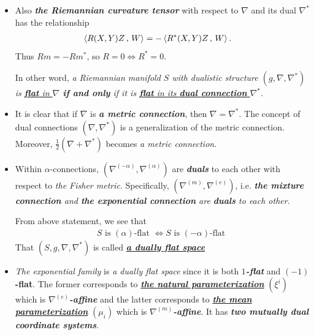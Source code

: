 \documentclass[11pt]{article}
\begin{document}
\begin{itemize}
\item Also \emph{\textbf{the Riemannian curvature tensor}} with respect to $\nabla$ and its dual $\nabla^{*}$ has the relationship
\begin{align*}
\left\langle R(X,Y)Z\,,\, W \right\rangle &= -\left\langle R^{*}(X,Y)Z\,,\, W \right\rangle.
\end{align*} Thus $Rm = -Rm^{*}$, so $R = 0 \Leftrightarrow R^{*} = 0$. 

In other word, \emph{a Riemannian manifold $S$ with dualistic structure $(g, \nabla, \nabla^{*})$ is \underline{\textbf{flat} in $\nabla$} \textbf{if and only} if it is \underline{\textbf{flat} in its \textbf{dual connection} $\nabla^{*}$}}.


\item It is clear that if $\nabla$ is \emph{\textbf{a metric connection}}, then $\nabla = \nabla^{*}$. The concept of dual connections $(\nabla, \nabla^{*})$ is a generalization of the metric connection. Moreover, $\frac{1}{2}(\nabla + \nabla^{*})$ becomes \emph{a metric connection}. 


\item Within $\alpha$-connections, $(\nabla^{(-\alpha)}, \nabla^{(\alpha)})$ are \textbf{\emph{duals}} to each other with respect to \emph{the Fisher metric}. Specifically, $(\nabla^{(m)}, \nabla^{(e)})$, i.e. \textit{\textbf{the mixture connection} and \textbf{the exponential connection} are \textbf{duals} to each other}.

From above statement, we see that 
\begin{align}
S \text{ is $(\alpha)$-flat } \Leftrightarrow S \text{ is $(-\alpha)$-flat }\label{eqn: dual_flat}
\end{align} That $(S, g, \nabla, \nabla^{*})$ is called \underline{\emph{\textbf{a dually flat space}}}

\item \begin{remark}
\emph{The exponential family} is \emph{a dually flat space} since it is both \emph{\textbf{$1$-flat}} and \textbf{$(-1)$-flat}. The former corresponds to \underline{\emph{\textbf{the natural parameterization}}} $(\xi^i)$ which is \emph{\textbf{$\nabla^{(e)}$-affine}} and the latter corresponds to \underline{\emph{\textbf{the mean parameterization}}} $(\mu_i)$ which is \emph{\textbf{$\nabla^{(m)}$-affine}}.  It has \emph{\textbf{two mutually dual coordinate systems}}.
\end{remark}
\end{itemize}
\end{document}
